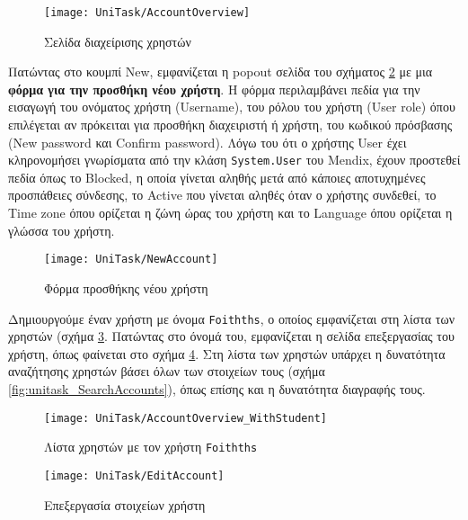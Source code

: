        \begin{figure}[h!] \noindent \centering
            \texttt{[image: UniTask/AccountOverview]}
            \caption{\centering Σελίδα διαχείρισης χρηστών}
            \label{fig:unitask_AccountOverview}
        \end{figure}

        Πατώντας στο κουμπί {\Zona New}, εμφανίζεται η popout σελίδα του σχήματος \ref{fig:unitask_NewAccount} με μια \textbf{φόρμα για την προσθήκη νέου χρήστη}. Η φόρμα περιλαμβάνει πεδία για την εισαγωγή του ονόματος χρήστη ({\Zona Username}), του ρόλου του χρήστη ({\Zona User role}) όπου επιλέγεται αν πρόκειται για προσθήκη διαχειριστή ή χρήστη, του κωδικού πρόσβασης ({\Zona New password} και {\Zona Confirm password}). Λόγω του ότι ο χρήστης User έχει κληρονομήσει γνωρίσματα από την κλάση \texttt{System.User} του Mendix, έχουν προστεθεί πεδία όπως το {\Zona Blocked}, η οποία γίνεται αληθής μετά από κάποιες αποτυχημένες προσπάθειες σύνδεσης, το {\Zona Active} που γίνεται αληθές όταν ο χρήστης συνδεθεί, το {\Zona Time zone} όπου ορίζεται η ζώνη ώρας του χρήστη και το {\Zona Language} όπου ορίζεται η γλώσσα του χρήστη.

        \begin{figure}[h!] \noindent \centering
            \texttt{[image: UniTask/NewAccount]}
            \caption{\centering Φόρμα προσθήκης νέου χρήστη}
            \label{fig:unitask_NewAccount}
        \end{figure}

        Δημιουργούμε έναν χρήστη με όνομα \texttt{Foithths}, ο οποίος εμφανίζεται στη λίστα των χρηστών (σχήμα \ref{fig:unitask_AccountOverview_WithStudent}. Πατώντας στο όνομά του, εμφανίζεται η σελίδα επεξεργασίας του χρήστη, όπως φαίνεται στο σχήμα \ref{fig:unitask_EditAccount}. Στη λίστα των χρηστών υπάρχει η δυνατότητα αναζήτησης χρηστών βάσει όλων των στοιχείων τους (σχήμα \ref{fig:unitask_SearchAccounts}), όπως επίσης και η δυνατότητα διαγραφής τους.

        \begin{figure}[h!] \noindent \centering
            \texttt{[image: UniTask/AccountOverview\_WithStudent]}
            \caption{\centering Λίστα χρηστών με τον χρήστη \texttt{Foithths}}
            \label{fig:unitask_AccountOverview_WithStudent}
        \end{figure}

        \begin{figure}[h!] \noindent \centering
            \texttt{[image: UniTask/EditAccount]}
            \caption{\centering Επεξεργασία στοιχείων χρήστη}
            \label{fig:unitask_EditAccount}
        \end{figure}

